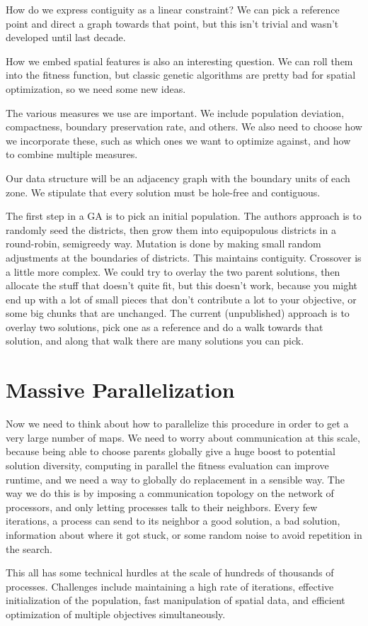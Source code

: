 How do we express contiguity as a linear constraint?  We can pick a reference point and direct a graph towards that point, but this isn't trivial and wasn't developed until last decade.

How we embed spatial features is also an interesting question.  We can roll them into the fitness function, but classic genetic algorithms are pretty bad for spatial optimization, so we need some new ideas.


The various measures we use are important.  We include population deviation, compactness, boundary preservation rate, and others.  We also need to choose how we incorporate these, such as which ones we want to optimize against, and how to combine multiple measures.

Our data structure will be an adjacency graph with the boundary units of each zone.  We stipulate that every solution must be hole-free and contiguous.  

The first step in a GA is to pick an initial population.  The authors approach is to randomly seed the districts, then grow them into equipopulous districts in a round-robin, semigreedy way.  Mutation is done by making small random adjustments at the boundaries of districts.  This maintains contiguity.  Crossover is a little more complex.  We could try to overlay the two parent solutions, then allocate the stuff that doesn't quite fit, but this doesn't work, because you might end up with a lot of small pieces that don't contribute a lot to your objective, or some big chunks that are unchanged.  The current (unpublished) approach is to overlay two solutions, pick one as a reference and do a walk towards that solution, and along that walk there are many solutions you can pick.


\section*{Massive Parallelization}

Now we need to think about how to parallelize this procedure in order to get a very large number of maps.  We need to worry about communication at this scale, because being able to choose parents globally give a huge boost to potential solution diversity, computing in parallel the fitness evaluation can improve runtime, and we need a way to globally do replacement in a sensible way. The way we do this is by imposing a communication topology on the network of processors, and only letting processes talk to their neighbors.  Every few iterations, a process can send to its neighbor a good solution, a bad solution, information about where it got stuck, or some random noise to avoid repetition in the search.

This all has some technical hurdles at the scale of hundreds of thousands of processes.  Challenges include maintaining a high rate of iterations, effective initialization of the population, fast manipulation of spatial data, and efficient optimization of multiple objectives simultaneously.